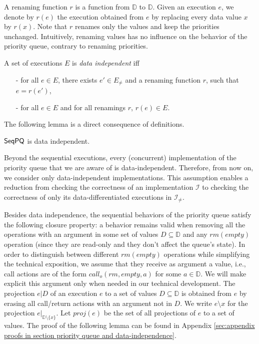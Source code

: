A renaming function $r$ is a function from $\mathbb{D}$ to $\mathbb{D}$. Given an execution $e$, we denote by $r(e)$ the execution obtained from $e$ by replacing every data value $x$ by $r(x)$. Note that $r$ renames only the values and keep the priorities unchanged. Intuitively, renaming values has no influence on the behavior of the priority queue, contrary to renaming priorities.

\begin{definition}\label{def:priority-value data-independence}
A set of executions $E$ is \emph{data independent} iff
\begin{itemize}
\setlength{\itemsep}{0.5pt}
\item[-] for all $e \in E$, there exists $e' \in E_{\neq}$ and a renaming function $r$, such that $e=r(e')$,

\item[-] for all $e \in E$ and for all renamings $r$, $r(e) \in E$.
\end{itemize}
\end{definition}

The following lemma is a direct consequence of definitions.

\begin{lemma}
$\mathsf{SeqPQ}$ is data independent.
\end{lemma}

Beyond the sequential executions, every (concurrent) implementation of the priority queue that we are aware of is data-independent. Therefore, from now on, we consider only data-independent implementations. This assumption enables a reduction from checking the correctness of an implementation $\mathcal{I}$ to checking the correctness of only its data-differentiated executions in $\mathcal{I}_{\neq}$.

Besides data independence, the sequential behaviors of the priority queue satisfy the following closure property: a behavior remains valid when removing all the operations with an argument in some set of values $D \subseteq \mathbb{D}$ and any $\textit{rm}(\textit{empty})$ operation (since they are read-only and they don't affect the queue's state).
In order to distinguish between different $\textit{rm}(\textit{empty})$ operations while simplifying the technical exposition, we assume that they receive as argument a value, i.e., call actions are of the form $\textit{call}_o(\textit{rm},\textit{empty},a)$ for some $a\in \mathbb{D}$. We will make explicit this argument only when needed in our technical development. The projection $e \vert D$ of an execution $e$ to a set of values $D \subseteq \mathbb{D}$ is obtained from $e$ by erasing all call/return actions with an argument not in $D$. We write $e \setminus x$ for the projection $e \vert_{ \mathbb{D} \setminus \{ x \} }$. Let $\textit{proj}(e)$ be the set of all projections of $e$ to a set of values. The proof of the following lemma can be found in Appendix \ref{sec:appendix proofs in section priority queue and data-independence}.

